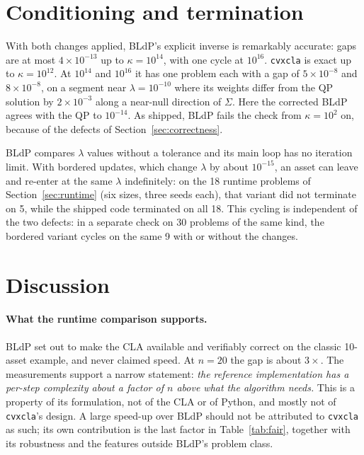 \documentclass[11pt,a4paper]{article}
\newcommand{\code}[1]{\texttt{#1}}
\newcommand{\cvxcla}{\code{cvxcla}}
\begin{document}
\section{Conditioning and termination}\label{sec:conditioning}

With both changes applied, BLdP's explicit inverse is remarkably accurate:
gaps are at most $4 \times 10^{-13}$ up to $\kappa = 10^{14}$, with one cycle
at $10^{16}$. \cvxcla{} is exact up to $\kappa = 10^{12}$. At $10^{14}$ and
$10^{16}$ it has one problem each with a gap of $5 \times 10^{-8}$ and
$8 \times 10^{-8}$, on a segment near $\lambda = 10^{-10}$ where its weights
differ from the QP solution by $2 \times 10^{-3}$ along a near-null direction
of $\Sigma$. Here the corrected BLdP agrees with the QP to $10^{-14}$. As
shipped, BLdP fails the check from $\kappa = 10^{2}$ on, because of the
defects of Section~\ref{sec:correctness}.

BLdP compares $\lambda$ values without a tolerance and its main loop has no
iteration limit. With bordered updates, which change $\lambda$ by about
$10^{-15}$, an asset can leave and re-enter at the same $\lambda$ indefinitely:
on the 18 runtime problems of Section~\ref{sec:runtime} (six sizes, three
seeds each), that variant did not terminate on 5, while the shipped code
terminated on all 18. This cycling is independent of the two defects: in a
separate check on 30 problems of the same kind, the bordered variant cycles on
the same 9 with or without the changes.

\section{Discussion}\label{sec:discussion}

\paragraph{What the runtime comparison supports.} BLdP set out to make the CLA
available and verifiably correct on the classic 10-asset example, and never
claimed speed. At $n = 20$ the gap is about $3\times$. The measurements support
a narrow statement: \emph{the reference implementation has a per-step
complexity about a factor of $n$ above what the algorithm needs.} This is a
property of its formulation, not of the CLA or of Python, and mostly not of
\cvxcla{}'s design. A large speed-up over BLdP should not be attributed to
\cvxcla{} as such; its own contribution is the last factor in
Table~\ref{tab:fair}, together with its robustness and the features outside
BLdP's problem class.
\end{document}
